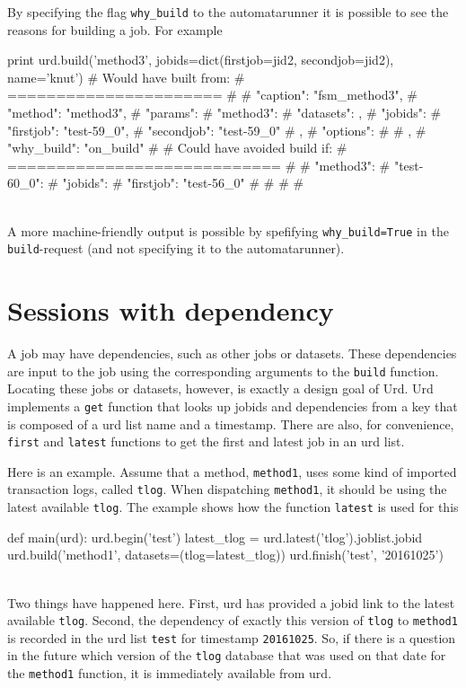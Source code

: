 By specifying the flag \texttt{why\_build} to the automatarunner it is
possible to see the reasons for building a job.  For example
\\
\begin{python}
  print urd.build('method3', jobids=dict(firstjob=jid2, secondjob=jid2), name='knut')
# Would have built from:
# ======================
# {
#     "caption": "fsm_method3", 
#     "method": "method3", 
#     "params": {
#         "method3": {
#             "datasets": {}, 
#             "jobids": {
#                 "firstjob": "test-59_0", 
#                 "secondjob": "test-59_0"
#             }, 
#             "options": {}
#         }
#     }, 
#     "why_build": "on_build"
# }
# Could have avoided build if:
# ============================
# {
#     "method3": {
#         "test-60_0": {
#             "jobids": {
#                 "firstjob": "test-56_0"
#             }
#         }
#     }
# }
\end{python}
\\
A more machine-friendly output is possible by spefifying
\texttt{why\_build=True} in the \texttt{build}-request (and not
specifying it to the automatarunner).



\newpage
\section{Sessions with dependency}

A job may have dependencies, such as other jobs or datasets.  These
dependencies are input to the job using the corresponding arguments to
the \texttt{build} function.  Locating these jobs or datasets,
however, is exactly a design goal of Urd.  Urd implements a
\texttt{get} function that looks up jobids and dependencies from a key
that is composed of a urd list name and a timestamp.  There are also,
for convenience, \texttt{first} and \texttt{latest} functions to get
the first and latest job in an urd list.

Here is an example.  Assume that a method, \texttt{method1}, uses some
kind of imported transaction logs, called \texttt{tlog}.  When
dispatching \texttt{method1}, it should be using the latest available
\texttt{tlog}.  The example shows how the function \texttt{latest} is
used for this
\\
\begin{python}
def main(urd):
  urd.begin('test')
  latest_tlog = urd.latest('tlog').joblist.jobid
  urd.build('method1', datasets=(tlog=latest_tlog))
  urd.finish('test', '20161025')
\end{python}
\\
Two things have happened here.  First, urd has provided a jobid link
to the latest available \texttt{tlog}.  Second, the dependency of
exactly this version of \texttt{tlog} to \texttt{method1} is recorded
in the urd list \texttt{test} for timestamp \texttt{20161025}.  So, if
there is a question in the future which version of the \texttt{tlog}
database that was used on that date for the \texttt{method1} function,
it is immediately available from urd.

